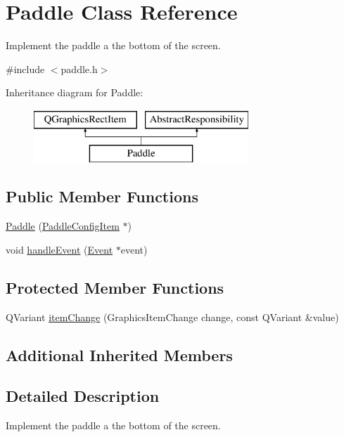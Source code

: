 \hypertarget{classPaddle}{\section{Paddle Class Reference}
\label{classPaddle}
}


Implement the paddle a the bottom of the screen.  




{\ttfamily \#include $<$paddle.\-h$>$}

Inheritance diagram for Paddle\-:\begin{figure}[H]
\begin{center}
\leavevmode
\includegraphics[height=2.000000cm]{classPaddle}
\end{center}
\end{figure}
\subsection*{Public Member Functions}
\begin{DoxyCompactItemize}
\item 
\hyperlink{classPaddle_ad796bdd2f07b024b1c518439149a2866}{Paddle} (\hyperlink{classPaddleConfigItem}{Paddle\-Config\-Item} $\ast$)
\item 
void \hyperlink{classPaddle_aef40328563790e25a73ee4c6b58fa390}{handle\-Event} (\hyperlink{classEvent}{Event} $\ast$event)
\end{DoxyCompactItemize}
\subsection*{Protected Member Functions}
\begin{DoxyCompactItemize}
\item 
Q\-Variant \hyperlink{classPaddle_ad2fa885cc0f5fdabb53429b19569a997}{item\-Change} (Graphics\-Item\-Change change, const Q\-Variant \&value)
\end{DoxyCompactItemize}
\subsection*{Additional Inherited Members}


\subsection{Detailed Description}
Implement the paddle a the bottom of the screen. 

